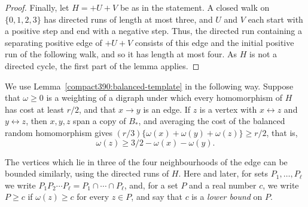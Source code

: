 \begin{proof}
Finally, let $H=+U+V$ be as in the statement. A closed walk on $\{0,1,2,3\}$ has directed runs of length at most three, and $U$ and $V$ each start with a positive step and end with a negative step. Thus, the directed run containing a separating positive edge of $+U+V$ consists of this edge and the initial positive run of the following walk, and so it has length at most four. As $H$ is not a directed cycle, the first part of the lemma applies.
\end{proof}

We use Lemma~\ref{compact390:balanced-template} in the following way. Suppose that $\omega\ge0$ is a weighting of a digraph under which every homomorphism of $H$ has cost at least $r/2$, and that $x\to y$ is an edge. If $z$ is a vertex with $x\leftrightarrow z$ and $y\leftrightarrow z$, then $x,y,z$ span a copy of $B_*$, and averaging the cost of the balanced random homomorphism gives $(r/3)\{\omega(x)+\omega(y)+\omega(z)\}\ge r/2$, that is,
\begin{equation}\label{balanced:bound}
 \omega(z)\ge3/2-\omega(x)-\omega(y).
\end{equation}

The vertices which lie in three of the four neighbourhoods of the edge can be bounded similarly, using the directed runs of $H$.
Here and later, for sets $P_1,\ldots,P_\ell$ we write $P_1P_2\cdots P_\ell=P_1\cap\cdots\cap P_\ell$, and, for a set $P$ and a real number $c$, we write $P\ge c$ if $\omega(z)\ge c$ for every $z\in P$, and say that $c$ is a \emph{lower bound} on $P$.

